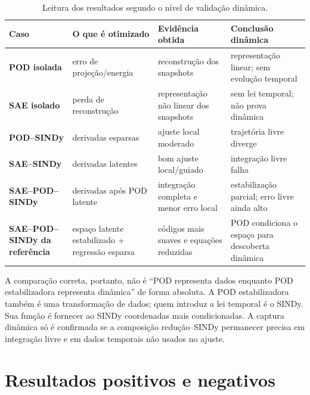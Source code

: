 \documentclass[12pt,a4paper]{article}
\begin{document}
\begin{table}[H]
\centering
\caption{Leitura dos resultados segundo o nível de validação dinâmica.}
\label{tab:niveisdinamica}
\begin{tabularx}{\textwidth}{>{\bfseries}l X X X}
\toprule
Caso & O que é otimizado & Evidência obtida & Conclusão dinâmica\\
\midrule
POD isolada & erro de projeção/energia & reconstrução dos snapshots & representação linear; sem evolução temporal\\
SAE isolado & perda de reconstrução & representação não linear dos snapshots & sem lei temporal; não prova dinâmica\\
POD--SINDy & derivadas esparsas & ajuste local moderado & trajetória livre diverge\\
SAE--SINDy & derivadas latentes & bom ajuste local/guiado & integração livre falha\\
SAE--POD--SINDy & derivadas após POD latente & integração completa e menor erro local & estabilização parcial; erro livre ainda alto\\
SAE--POD--SINDy da referência & espaço latente estabilizado + regressão esparsa & códigos mais suaves e equações reduzidas & POD condiciona o espaço para descoberta dinâmica\\
\bottomrule
\end{tabularx}
\end{table}

A comparação correta, portanto, não é ``POD representa dados enquanto POD estabilizadora representa dinâmica'' de forma absoluta. A POD estabilizadora também é uma transformação de dados; quem introduz a lei temporal é o SINDy. Sua função é fornecer ao SINDy coordenadas mais condicionadas. A captura dinâmica só é confirmada se a composição redução--SINDy permanecer precisa em integração livre e em dados temporais não usados no ajuste.

\section{Resultados positivos e negativos}
\end{document}
